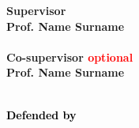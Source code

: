 \begin{titlepage}
    \vspace{50mm} \par \noindent
    
    \begin{minipage}[t]{0.47\textwidth}
        {\large{\bf Supervisor \vspace{2mm}\\
        Prof. Name Surname\\\\
        \bf Co-supervisor \textcolor{red}{optional}
        \vspace{2mm}\\
        Prof. Name Surname\\\\}}
    \end{minipage}
    \hfill
    \begin{minipage}[L]{0.35\textwidth} \textcolor{black}{
        {\large{\bf  Defended by
        \vspace{2mm}\\
        }}
        }
    \end{minipage}
    
\end{titlepage}